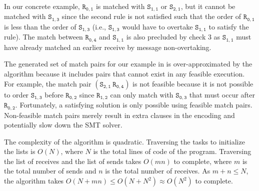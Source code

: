 In our concrete example, $\mathtt{R_{0,1}}$ is matched with
$\mathtt{S_{1,1}}$ or $\mathtt{S_{2,1}}$, but it cannot be matched
with $\mathtt{S_{1,3}}$ since the second rule is not satisfied such
that the order of $\mathtt{R_{0,1}}$ is less than the order of
$\mathtt{S_{1,3}}$ (i.e., $\mathtt{S_{1,3}}$ would have to overtake
$\mathtt{S_{1,1}}$ to satisfy the rule). The match between
$\mathtt{R_{0,4}}$ and $\mathtt{S_{1,1}}$ is also precluded by check 3
as $\mathtt{S_{1,1}}$ must have already matched an earlier receive by
message non-overtaking.

The generated set of match pairs for our example
in  is over-approximated by the algorithm because
it includes pairs that cannot exist in any feasible execution. For
example, the match pair $(\mathtt{S_{2,1}}\ \mathtt{R_{0,4}})$ is not
feasible because it is not possible to order $\mathtt{S_{1,3}}$ before
$\mathtt{R_{0,2}}$ since $\mathtt{R_{1,2}}$ can only match with
$\mathtt{S_{0,3}}$ that must occur after
$\mathtt{R_{0,2}}$. Fortunately, a satisfying solution is only
possible using feasible match pairs. Non-feasible match pairs
merely result in extra clauses in the encoding and potentially slow
down the SMT solver.

The complexity of the algorithm is quadratic. Traversing
the tasks to initialize the lists is $O(N)$, where $N$ is the total
lines of code of the program. Traversing the list of receives and the
list of sends takes $O(mn)$ to complete, where $m$ is the total number
of sends and $n$ is the total number of receives. As $m + n \le N$,
the algorithm takes $O(N + mn) \leq O(N + N^2) \approx O(N^2)$ to
complete. 

